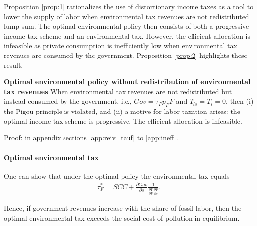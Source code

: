
Proposition \ref{prop:1} rationalizes the use of distortionary income taxes as a tool to lower the supply of labor when environmental tax revenues are not redistributed lump-sum. 
The optimal environmental policy then consists of both a progressive income tax scheme and an environmental tax. However, the efficient allocation is infeasible as private consumption is inefficiently low when environmental tax revenues are consumed by the government. Proposition \ref{prop:2} highlights these result.

\begin{prop}\label{prop:2}\textbf{Optimal environmental policy without redistribution of environmental tax revenues}
When environmental tax revenues are not redistributed but instead consumed by the government, i.e., $Gov=\tau_Fp_FF$ and $T_{ls}=T_\iota=0$, then (i) the Pigou principle is violated, and (ii) a motive for labor taxation arises: the optimal income tax scheme is progressive. %
The efficient allocation is infeasible.  
\end{prop}

Proof: in appendix sections \ref{app:reiv_tauf} to \ref{app:ineff}.

\paragraph{Optimal environmental tax}
One can show that under the optimal policy the environmental tax equals
	\begin{align}
\tau_{F}^*= SCC+\frac{\partial Gov}{\partial s}\frac{1}{\frac{\partial Y}{\partial F}\frac{\partial F}{\partial s}}.
\end{align}
\begin{comment}
content...

This can be further simplified:
\begin{align}
\tau_F^* = 1-\frac{SCC}{\frp{w}{s}}w. 
\end{align}
A condition for $\tau_F$ to exceed the social cost of the externality reads
\begin{align}
SCC<\frac{1}{1+\frac{w}{\frp{w}{s}}}
\end{align}
\end{comment}
Hence, if government revenues increase with the share of fossil labor, then the optimal environmental tax exceeds the social cost of pollution in equilibrium. 	

